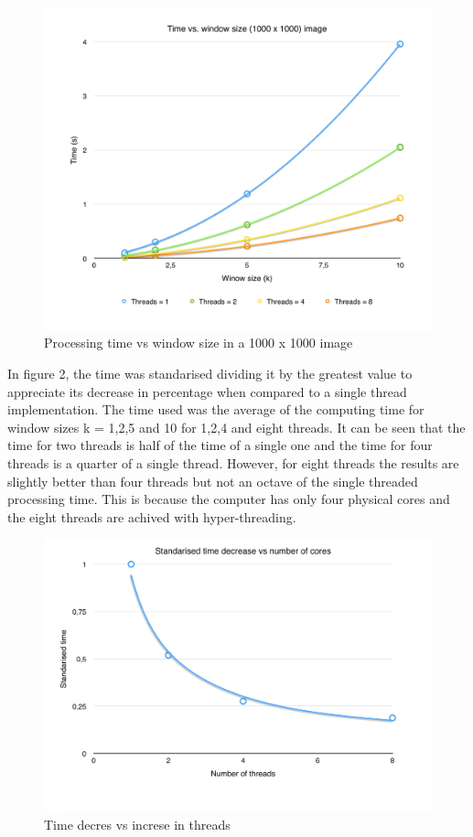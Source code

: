 \documentclass[a4paper,10pt]{article}
\begin{document}
\begin{figure}[H]
\centering
\includegraphics[width=1\textwidth]{figures/w1_timeVsSize}
\caption{Processing time vs window size in a 1000 x 1000 image}
\label{fig:pca_type}
\end{figure}

In figure 2, the time was standarised dividing it by the greatest value to appreciate its decrease in percentage when compared to a single thread implementation. The time used was the average of the computing time for window sizes k = 1,2,5 and 10 for 1,2,4 and eight threads. It can be seen that the time for two threads is half of the time of a single one and the time for four threads is a quarter of a single thread. However, for eight threads the results are slightly better than four threads but not an octave of the single threaded processing time. This is because the computer has only four physical cores and the eight threads are achived with hyper-threading.

\begin{figure}[H]
\centering
\includegraphics[width=1\textwidth]{figures/w1_timeVsCores}
\caption{Time decres vs increse in threads}
\label{fig:pca_type}
\end{figure}
\end{document}
